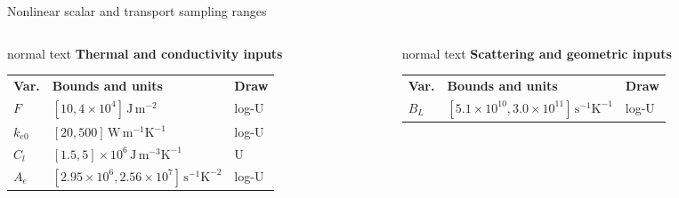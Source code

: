 \documentclass[aspectratio=169,10pt]{beamer}
\begin{document}
\begin{frame}[t]{Nonlinear scalar and transport sampling ranges}
  \hypertarget{supp:sampling-nonlinear-scalars}{}
  \vspace{-0.18cm}\hfill
  \hspace{0.10cm}\GVBackupIndexButton
  \vspace{0.02cm}
  \begin{columns}[T,totalwidth=0.94\textwidth]
    \begin{column}{0.45\textwidth}
      \begin{beamercolorbox}[wd=\linewidth,sep=0.45em]{normal text}
        \small\textbf{\color{GVTeal}Thermal and conductivity inputs}\par
        \vspace{0.07cm}
        \scriptsize\renewcommand{\arraystretch}{1.15}
        \begin{tabular}{@{}lll@{}}
          \rowcolor{GVTealTint}
          \textbf{Var.} & \textbf{Bounds and units} & \textbf{Draw} \\
          \(F\) & \([10,4\times10^4]\,\mathrm{J\,m^{-2}}\) & log-U \\
          \(k_{e0}\) & \([20,500]\,\mathrm{W\,m^{-1}K^{-1}}\) & log-U \\
          \(C_l\) & \([1.5,5]\times10^6\,\mathrm{J\,m^{-3}K^{-1}}\) & U \\
          \(A_e\) & \([2.95\times10^6,2.56\times10^7]\,\mathrm{s^{-1}K^{-2}}\) & log-U \\
        \end{tabular}
      \end{beamercolorbox}
    \end{column}
    \begin{column}{0.45\textwidth}
      \begin{beamercolorbox}[wd=\linewidth,sep=0.45em]{normal text}
        \small\textbf{\color{GVDiffusionGreen}Scattering and geometric inputs}\par
        \vspace{0.07cm}
        \scriptsize\renewcommand{\arraystretch}{1.15}
        \begin{tabular}{@{}lll@{}}
          \rowcolor{GVTealTint}
          \textbf{Var.} & \textbf{Bounds and units} & \textbf{Draw} \\
          \(B_L\) & \([5.1\times10^{10},3.0\times10^{11}]\,\mathrm{s^{-1}K^{-1}}\) & log-U \\

\end{tabular}
\end{beamercolorbox}
\end{column}
\end{columns}
\end{frame}
\end{document}
